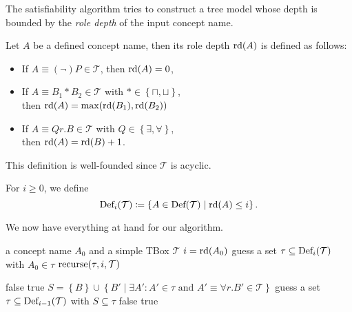 The satisfiability algorithm tries to construct a tree model
whose depth is bounded by the \textit{role depth} of the input concept name.

\begin{definition*}
	Let $A$ be a defined concept name,
	then its role depth $\operatorname{\text{rd}}(A)$ is defined as follows:
	\begin{itemize}
		\item If $A \equiv (\neg) P \in \mathcal{T}$, then $\operatorname{\text{rd}}(A) = 0$,
		\item If $A \equiv B_1 * B_2 \in \mathcal{T}$ with $* \in \left\{ \sqcap, \sqcup \right\}$,\\
			then $\operatorname{\text{rd}}(A) = \operatorname{\text{max}}(\operatorname{\text{rd}}(B_1), \operatorname{\text{rd}}(B_2))$
		\item If $A \equiv Qr.B \in \mathcal{T}$ with $Q \in \left\{ \exists, \forall \right\}$, \\
			then $\operatorname{\text{rd}}(A) = \operatorname{\text{rd}}(B) + 1$.
	\end{itemize}
\end{definition*}
\begin{note}
	This definition is well-founded since $\mathcal{T}$ is acyclic.
\end{note}
For $i \geq 0$, we define
\[
	\operatorname{\text{Def}}_i(\mathcal{T}) \coloneqq \left\{ A \in \operatorname{\text{Def}}(\mathcal{T}) \mid \operatorname{\text{rd}}(A) \leq i \right\}
.\]

We now have everything at hand for our algorithm.
\begin{mdframed}
	\begin{algorithm}[H]
		\caption{$\mathcal{ALC}\func{-Worlds}(A_0, \mathcal{T})$}
		\label{alg:alc-worlds}
		\begin{algorithmic}[1]
			\Require a concept name $A_0$ and a simple TBox $\mathcal{T}$
			\State $i = \operatorname{\text{rd}}(A_0)$
			\State guess a set $\tau \subseteq \operatorname{\text{Def}}_i(\mathcal{T})$ with $A_0 \in \tau$ 
			\State $\func{recurse}(\tau, i, \mathcal{T})$
		\end{algorithmic}
	\end{algorithm}
	\begin{algorithm}[H]
		\caption{$\func{recurse}(\tau, i , \mathcal{T})$}
		\label{alg:recurse}
		\begin{algorithmic}[1]
			 \Return false \EndIf
			 \Return true \EndIf
				\State $S = \left\{ B \right\} \cup \left\{ B' \mid \exists A': A' \in \tau \text{ and } A' \equiv \forall r.B' \in \mathcal{T} \right\}$
				\State guess a set $\tau \subseteq \operatorname{\text{Def}}_{i-1}(\mathcal{T})$ with $S \subseteq \tau$ 
				 \Return false \EndIf
			\EndFor
			\Return true
		\end{algorithmic}
	\end{algorithm}
\end{mdframed}
